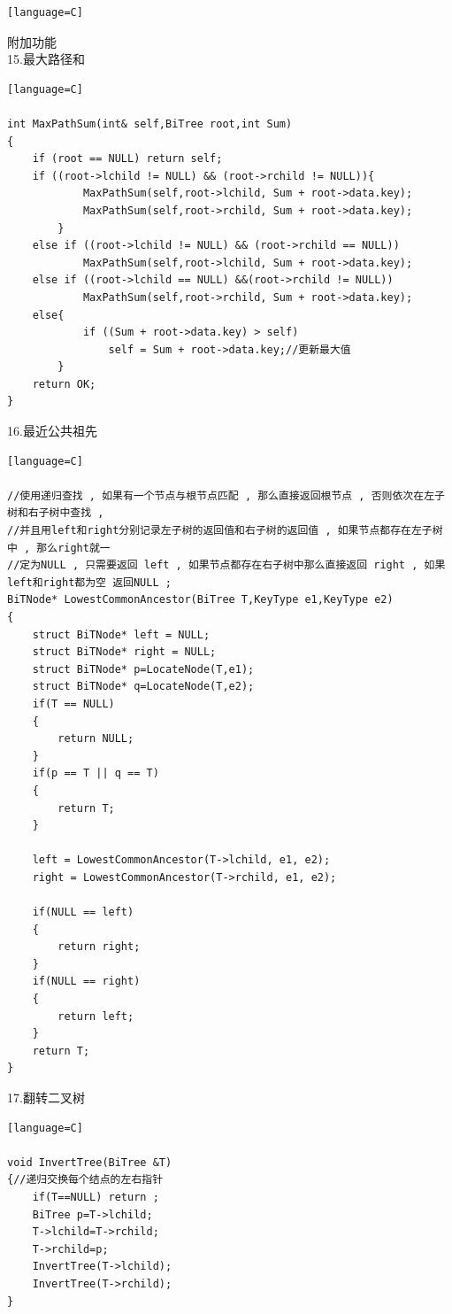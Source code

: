 \documentclass[supercite]{Experimental_Report}
\theoremstyle{definition}
\begin{document}
\begin{sloppypar}
\begin{lstlisting}[breaklines][language=C]
\end{lstlisting}

附加功能\\
15.最大路径和

\begin{lstlisting}[breaklines][language=C]

int MaxPathSum(int& self,BiTree root,int Sum)
{
	if (root == NULL) return self;
    if ((root->lchild != NULL) && (root->rchild != NULL)){
			MaxPathSum(self,root->lchild, Sum + root->data.key);
            MaxPathSum(self,root->rchild, Sum + root->data.key);
		}           
    else if ((root->lchild != NULL) && (root->rchild == NULL))
            MaxPathSum(self,root->lchild, Sum + root->data.key);
    else if ((root->lchild == NULL) &&(root->rchild != NULL))
            MaxPathSum(self,root->rchild, Sum + root->data.key);
	else{
			if ((Sum + root->data.key) > self)
                self = Sum + root->data.key;//更新最大值
		} 
	return OK;    
}

\end{lstlisting}

16.最近公共祖先

\begin{lstlisting}[breaklines][language=C]

//使用递归查找 , 如果有一个节点与根节点匹配 , 那么直接返回根节点 , 否则依次在左子树和右子树中查找 ,
//并且用left和right分别记录左子树的返回值和右子树的返回值 , 如果节点都存在左子树中 , 那么right就一
//定为NULL , 只需要返回 left , 如果节点都存在右子树中那么直接返回 right , 如果left和right都为空 返回NULL ;
BiTNode* LowestCommonAncestor(BiTree T,KeyType e1,KeyType e2)
{
	struct BiTNode* left = NULL;
    struct BiTNode* right = NULL;
	struct BiTNode* p=LocateNode(T,e1);
	struct BiTNode* q=LocateNode(T,e2);
    if(T == NULL)
    {
        return NULL;
    }
    if(p == T || q == T)
    {
        return T;
    }

    left = LowestCommonAncestor(T->lchild, e1, e2);
    right = LowestCommonAncestor(T->rchild, e1, e2);

    if(NULL == left)
    {
        return right;
    }
    if(NULL == right)
    {
        return left;
    }
    return T;
}

\end{lstlisting}

17.翻转二叉树

\begin{lstlisting}[breaklines][language=C]

void InvertTree(BiTree &T)
{//递归交换每个结点的左右指针
	if(T==NULL) return ;
	BiTree p=T->lchild;
	T->lchild=T->rchild;
	T->rchild=p;
	InvertTree(T->lchild);
	InvertTree(T->rchild);
}


\end{lstlisting}
\end{sloppypar}
\end{document}
